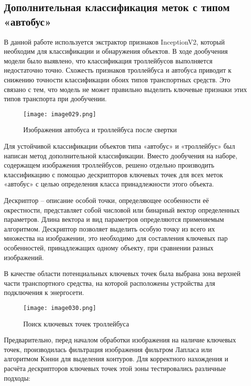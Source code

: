\subsection{Дополнительная классификация меток с типом «автобус»}

В данной работе используется экстрактор признаков InceptionV2, который необходим для классификации и обнаружения объектов. В ходе дообучения модели было выявлено, что классификация троллейбусов выполняется недостаточно точно. Схожесть признаков троллейбуса и автобуса приводит к снижению точности классификации обоих типов транспортных средств. Это связано с тем, что модель не может правильно выделить ключевые признаки этих типов транспорта при дообучении. 

\begin{figure}[htbp]
\centering
\texttt{[image: image029.png]}
\caption{Изображения автобуса и троллейбуса после свертки}%
\label{fig:empty}
\end{figure}

Для устойчивой классификации объектов типа «автобус» и «троллейбус» был написан метод дополнительной классификации. Вместо дообучения на наборе, содержащем изображения троллейбусов, решено отдельно производить классификацию с помощью дескрипторов ключевых точек для всех меток «автобус» с целью определения класса принадлежности этого объекта.

Дескриптор – описание особой точки, определяющее особенности её окрестности, представляет собой числовой или бинарный вектор определенных параметров. Длина вектора и вид параметров определяются применяемым алгоритмом.  Дескриптор позволяет выделить особую точку из всего их множества на изображении, это необходимо для составления ключевых пар особенностей, принадлежащих одному объекту, при сравнении разных изображений\cite{twentytwo}.

В качестве области потенциальных ключевых точек была выбрана зона верхней части транспортного средства, на которой расположены устройства для подключения к энергосети. 

\begin{figure}[htbp]
\centering
\texttt{[image: image030.png]}
\caption{Поиск ключевых точек троллейбуса}%
\label{fig:empty}
\end{figure}

Предварительно, перед началом обработки изображения на наличие ключевых точек, производилась фильтрация изображения фильтром Лапласа или алгоритмом Кэнни для выделения контуров. Для корректного нахождения и расчёта дескрипторов ключевых точек этой зоны тестировались различные подходы: 

